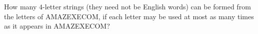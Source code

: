 How many $4$-letter strings (they need not be English words) can be formed from the letters of AMAZEXECOM, if each letter may be used at most as many times as it appears in AMAZEXECOM?
